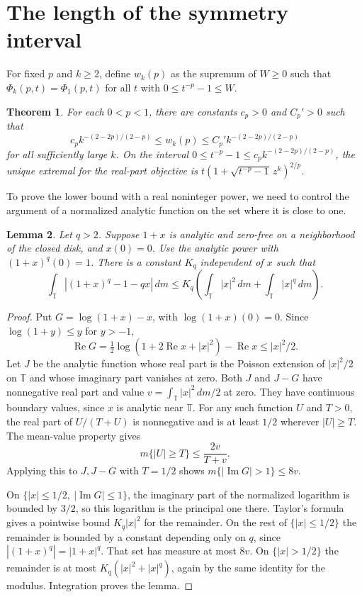 \documentclass[11pt]{article}
\numberwithin{equation}{section}
\newtheorem{theorem}{Theorem}[section]
\newtheorem{lemma}[theorem]{Lemma}
\theoremstyle{remark}
\newcommand{\T}{\mathbb T}
\newcommand{\area}{\,dm}
\newcommand{\Rea}{\operatorname{Re}}
\begin{document}
\section{The length of the symmetry interval}

For fixed \(p\) and \(k\ge2\), define \(w_k(p)\) as the supremum of
\(W\ge0\) such that \(\Phi_k(p,t)=\Phi_1(p,t)\) for all \(t\) with
\(0\le t^{-p}-1\le W\).

\begin{theorem}\label{thm:scale}
For each \(0<p<1\), there are constants \(c_p>0\) and \(C_p'>0\) such that
\[
 c_p k^{-(2-2p)/(2-p)} \le w_k(p)\le
 C_p' k^{-(2-2p)/(2-p)}
\]
for all sufficiently large \(k\). On the interval
\(0\le t^{-p}-1\le c_p k^{-(2-2p)/(2-p)}\),
the unique extremal for the real-part objective is
\(t(1+\sqrt{t^{-p}-1}\,z^k)^{2/p}\).
\end{theorem}

To prove the lower bound with a real noninteger power, we need to
control the argument of a normalized analytic function on the set
where it is close to one.

\begin{lemma}\label{lem:L1}
Let \(q>2\). Suppose \(1+x\) is analytic and zero-free on a neighborhood
of the closed disk, and \(x(0)=0\).
Use the analytic power with \((1+x)^q(0)=1\).
There is a constant \(K_q\) independent of \(x\) such that
\[
  \int_\T |(1+x)^q-1-qx|\area
     \le K_q\left(\int_\T |x|^2\area+\int_\T |x|^q\area\right).
\]
\end{lemma}
\begin{proof}
Put \(G=\log(1+x)-x\), with \(\log(1+x)(0)=0\).
Since \(\log(1+y)\le y\) for \(y>-1\),
\[
 \Rea G=\tfrac12\log(1+2\Rea x+|x|^2)-\Rea x\le |x|^2/2 .
\]
Let \(J\) be the analytic function whose real part is the Poisson
extension of \(|x|^2/2\) on \(\T\) and whose imaginary part vanishes at
zero. Both \(J\) and \(J-G\) have nonnegative real part and value
\(v=\int_\T |x|^2\area/2\) at zero. They have continuous boundary
values, since \(x\) is analytic near \(\T\).
For any such function \(U\) and \(T>0\), the real part of
\(U/(T+U)\) is nonnegative and is at least \(1/2\) wherever
\(|U|\ge T\). The mean-value property gives
\[
 m\{|U|\ge T\}\le \frac{2v}{T+v}.
\]
Applying this to \(J,J-G\) with \(T=1/2\) shows
\(m\{|\operatorname{Im}G|>1\}\le8v\).

On \(\{|x|\le1/2,\ |\operatorname{Im}G|\le1\}\), the imaginary part of
the normalized logarithm is bounded by \(3/2\), so this logarithm is
the principal one there. Taylor's formula gives a pointwise bound
\(K_q|x|^2\) for the remainder. On the rest of \(\{|x|\le1/2\}\) the
remainder is bounded by a constant depending only on \(q\), since
\(|(1+x)^q|=|1+x|^q\). That set has measure at most \(8v\).
On \(\{|x|>1/2\}\) the remainder is at most \(K_q(|x|^2+|x|^q)\),
again by the same identity for the modulus. Integration proves the
lemma.
\end{proof}
\end{document}
